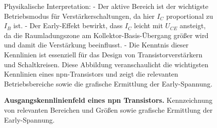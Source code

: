{\begin{figure}[H]
{    Physikalische Interpretation: 
    - Der aktive Bereich ist der wichtigste Betriebsmodus für Verstärkerschaltungen, da hier \( I_C \) proportional zu \( I_B \) ist.  
    - Der Early-Effekt bewirkt, dass \( I_C \) leicht mit \( U_{CE} \) ansteigt, da die Raumladungszone am Kollektor-Basis-Übergang größer wird und damit die Verstärkung beeinflusst.  
    - Die Kenntnis dieser Kennlinien ist essenziell für das Design von Transistorverstärkern und Schaltkreisen.  
    Diese Abbildung veranschaulicht die wichtigsten Kennlinien eines npn-Transistors und zeigt die relevanten Betriebsbereiche sowie die grafische Ermittlung der Early-Spannung.}
    \caption{\textbf{Ausgangskennlinienfeld eines npn Transistors.} Kennzeichnung von relevanten Bereichen und Größen sowie 
    grafische Ermittlung der Early-Spannung.}  
    \label{fig:AusgangskennlinienfeldEinesNpnTransistors}
\end{figure}
}

